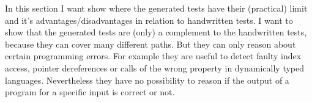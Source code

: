 In this section I want show where the generated tests have their (practical) limit and it's advantages/disadvantages in relation to handwritten tests.
I want to show that the generated tests are (only) a complement to the handwritten tests, because they can cover many different paths. But they can only reason about certain programming errors. For example they are useful to detect faulty index access, pointer dereferences or calls of the wrong property in dynamically typed languages. Nevertheless they have no possibility to reason if the output of a program for a specific input is correct or not.